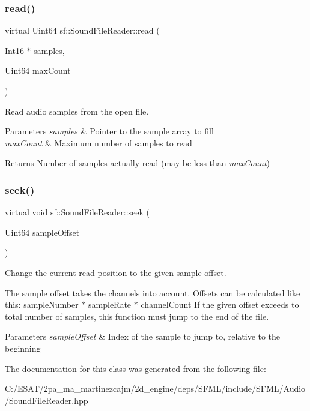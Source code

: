 \subsubsection{\texorpdfstring{read()}{read()}}
{\footnotesize\ttfamily virtual Uint64 sf\+::\+Sound\+File\+Reader\+::read (\begin{DoxyParamCaption}\item[{Int16 $\ast$}]{samples,  }\item[{Uint64}]{max\+Count }\end{DoxyParamCaption})\hspace{0.3cm}{\ttfamily [pure virtual]}}



Read audio samples from the open file. 


\begin{DoxyParams}{Parameters}
{\em samples} & Pointer to the sample array to fill \\
\hline
{\em max\+Count} & Maximum number of samples to read\\
\hline
\end{DoxyParams}
\begin{DoxyReturn}{Returns}
Number of samples actually read (may be less than {\itshape max\+Count}) 
\end{DoxyReturn}
\mbox{\label{classsf_1_1_sound_file_reader_a1e18ade5ffe882bdfa20a2ebe7e2b015}} 
\subsubsection{\texorpdfstring{seek()}{seek()}}
{\footnotesize\ttfamily virtual void sf\+::\+Sound\+File\+Reader\+::seek (\begin{DoxyParamCaption}\item[{Uint64}]{sample\+Offset }\end{DoxyParamCaption})\hspace{0.3cm}{\ttfamily [pure virtual]}}



Change the current read position to the given sample offset. 

The sample offset takes the channels into account. Offsets can be calculated like this\+: {\ttfamily sample\+Number $\ast$ sample\+Rate $\ast$ channel\+Count} If the given offset exceeds to total number of samples, this function must jump to the end of the file.


\begin{DoxyParams}{Parameters}
{\em sample\+Offset} & Index of the sample to jump to, relative to the beginning \\
\hline
\end{DoxyParams}


The documentation for this class was generated from the following file\+:\begin{DoxyCompactItemize}
\item 
C\+:/\+E\+S\+A\+T/2pa\+\_\+ma\+\_\+martinezcajm/2d\+\_\+engine/deps/\+S\+F\+M\+L/include/\+S\+F\+M\+L/\+Audio/Sound\+File\+Reader.\+hpp\end{DoxyCompactItemize}
